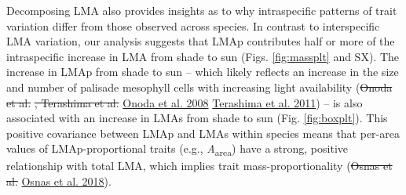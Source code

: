 \documentclass[
  12pt,
]{article}
\providecommand{\DIFaddtex}[1]{{\protect\color{blue}\uwave{#1}}} %
\providecommand{\DIFdeltex}[1]{{\protect\color{red}\sout{#1}}}                      %
\providecommand{\DIFaddbegin}{} %
\providecommand{\DIFaddend}{} %
\providecommand{\DIFdelbegin}{} %
\providecommand{\DIFdelend}{} %
\providecommand{\DIFadd}[1]{\texorpdfstring{\DIFaddtex{#1}}{#1}} %
\providecommand{\DIFdel}[1]{\texorpdfstring{\DIFdeltex{#1}}{}} %
\newcommand{\DIFscaledelfig}{0.5}
\newlength{\DIFdelgraphicswidth} %
\newlength{\DIFdelgraphicsheight} %
\newcommand{\DIFaddincludegraphics}[2][]{{\color{blue}\fbox{\DIFOincludegraphics[#1]{#2}}}} %
\newcommand{\DIFdelincludegraphics}[2][]{%
\sbox{\DIFdelgraphicsbox}{\DIFOincludegraphics[#1]{#2}}%
\settoboxwidth{\DIFdelgraphicswidth}{\DIFdelgraphicsbox} %
\settoboxtotalheight{\DIFdelgraphicsheight}{\DIFdelgraphicsbox} %
\scalebox{\DIFscaledelfig}{%
\parbox[b]{\DIFdelgraphicswidth}{\usebox{\DIFdelgraphicsbox}\\[-\baselineskip] \rule{\DIFdelgraphicswidth}{0em}}\llap{\resizebox{\DIFdelgraphicswidth}{\DIFdelgraphicsheight}{%
\setlength{\unitlength}{\DIFdelgraphicswidth}%
\begin{picture}(1,1)%
\thicklines\linethickness{2pt} %
{\color[rgb]{1,0,0}\put(0,0){\framebox(1,1){}}}%
{\color[rgb]{1,0,0}\put(0,0){\line( 1,1){1}}}%
{\color[rgb]{1,0,0}\put(0,1){\line(1,-1){1}}}%
\end{picture}%
}\hspace*{3pt}}} %
} %
\DeclareRobustCommand{\DIFaddbegin}{\DIFOaddbegin \let\includegraphics\DIFaddincludegraphics} %
\DeclareRobustCommand{\DIFaddend}{\DIFOaddend \let\includegraphics\DIFOincludegraphics} %
\DeclareRobustCommand{\DIFdelbegin}{\DIFOdelbegin \let\includegraphics\DIFdelincludegraphics} %
\DeclareRobustCommand{\DIFdelend}{\DIFOaddend \let\includegraphics\DIFOincludegraphics} %
\begin{document}
Decomposing LMA also provides insights as to why intraspecific patterns of trait variation differ from those observed across species.
In contrast to interspecific LMA variation, our analysis suggests that LMAp contributes half or more of the intraspecific increase in LMA from shade to sun (Figs. \DIFaddbegin \DIFadd{Fig.~}\DIFaddend \ref{fig:massplt} and SX).
The increase in LMAp from shade to sun -- which likely reflects an increase in the size and number of palisade mesophyll cells with increasing light availability (\DIFdelbegin \DIFdel{Onoda et al. }\DIFdelend \protect\DIFdelbegin %
\DIFdel{, Terashima et al. }\DIFdelend \DIFaddbegin \hyperlink{ref-Onoda2008}{Onoda et al. 2008}\DIFadd{, }\DIFaddend \protect\DIFdelbegin %
\DIFdelend \DIFaddbegin \hyperlink{ref-Terashima2011}{Terashima et al. 2011}\DIFaddend ) -- is also associated with an increase in LMAs from shade to sun (Fig. \DIFaddbegin \DIFadd{Fig.~}\DIFaddend \ref{fig:boxplt}).
This positive covariance between LMAp and LMAs within species means that per-area values of LMAp-proportional traits (e.g., \emph{A}\textsubscript{area}) have a strong, positive relationship with total LMA, which implies trait mass-proportionality (\DIFdelbegin \DIFdel{Osnas et al. }\DIFdelend \protect\DIFdelbegin %
\DIFdelend \DIFaddbegin \hyperlink{ref-Osnas2018}{Osnas et al. 2018}\DIFaddend ).
\end{document}
